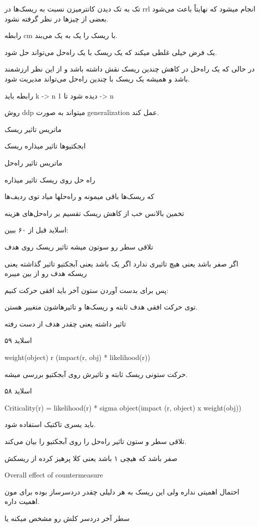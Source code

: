 تک به تک دیدن کانترمیزن نسبت به ریسک‌ها در rrl انجام میشود که نهایتاً باعث
می‌شود بعضی از چیز‌ها در نظر گرفته نشود.

رابطه cm با ریسک را یک به یک می‌بند.

یک فرض خیلی غلطی میکند که یک ریسک با یک راه‌حل می‌تواند حل شود.

در حالی که یک راه‌حل در کاهش چندین ریسک نقش داشته باشد و از این نظر ارزشمند باشد
و همیشه یک ریسک با چندین راه‌حل می‌تواند مدیریت شود.

رابطه باید
k -> n 
دیده شود تا 1 -> n

روش ddp میتواند به صورت generalization عمل کند.


ماتریس تاثیر ریسک

ابجکتیو‌ها تاثیر میذاره ریسک

ماتریس تاثیر راه‌حل

راه حل روی ریسک تاثیر میذاره

که ریسک‌ها باقی میمونه و راه‌حلها میاد توی ردیف‌ها

تخمین بالانس خب از کاهش ریسک تقسیم بر راه‌حل‌های هزینه

اسلاید قبل از ۶۰ ببین:

تلاقی سطر رو سوتون میشه تاثیر ریسک روی هدف

اگر صفر باشد یعنی هیچ تاثیری ندارد
اگر یک باشد یعنی آبجکتیو تاثیر گذاشته
یعنی ریسکه هدف رو از بین میبره

پس برای بدست آوردن ستون آخر باید افقی حرکت کنیم:

توی حرکت افقی هدف ثابته و ریسک‌ها و تاثیر‌هاشون متغییر هستن.

تاثیر داشته یعنی چقدر هدف از دست رفته

اسلاید ۵۹

weight(object) \sigma r (impact(r, obj) * likelihood(r))

حرکت ستونی ریسک ثابته و تاثیرش روی آبجکتیو بررسی میشه.

اسلاید ۵۸

Criticality(r) = likelihood(r) * sigma object(impact (r, object) x weight(obj))

باید یسری تاکتیک استفاده شود. 

تلاقی سطر و ستون تاثیر راه‌حل را روی آبجکتیو را بیان می‌کند.

صفر باشد که هیچی
۱ باشد یعنی کلا پرهیز کرده از ریسکش

Overall effect of countermeasure

احتمال اهمیتی نداره ولی این ریسک به هر دلیلی چقدر دردسرساز بوده برای مون اهمیت
داره.

سطر آخر دردسر کلش رو مشخص میکنه یا 


